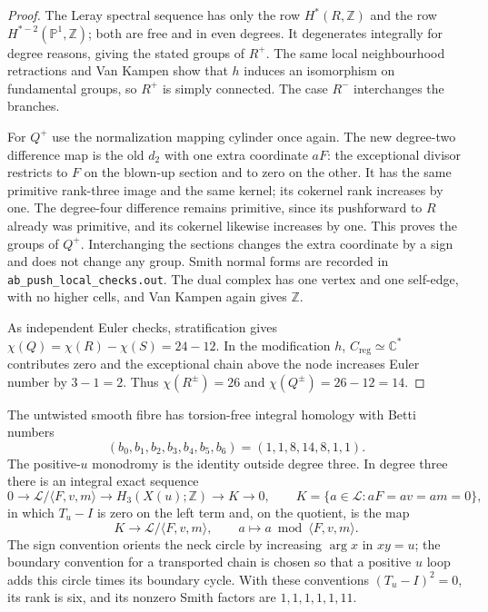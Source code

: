 \begin{proof}
The Leray spectral sequence has only the row $H^*(R,\mathbb Z)$
and the row $H^{*-2}(\mathbb P^1,\mathbb Z)$; both are free
and in even degrees. It degenerates integrally for degree
reasons, giving the stated groups of $R^+$. The same local
neighbourhood retractions and Van Kampen show that $h$ induces
an isomorphism on fundamental groups, so $R^+$ is simply
connected. The case $R^-$ interchanges the branches.

For $Q^+$ use the normalization mapping cylinder once again.
The new degree-two difference map is the old $d_2$ with
one extra coordinate $aF$: the exceptional divisor restricts
to $F$ on the blown-up section and to zero on the other.
It has the same primitive rank-three image and the same
kernel; its cokernel rank increases by one. The degree-four
difference remains primitive, since its pushforward to $R$
already was primitive, and its cokernel likewise increases
by one. This proves the groups of $Q^+$. Interchanging the
sections changes the extra coordinate by a sign and does
not change any group. Smith normal forms are recorded in
\texttt{ab\_push\_local\_checks.out}. The dual complex has
one vertex and one self-edge, with no higher cells, and
Van Kampen again gives $\mathbb Z$.

As independent Euler checks, stratification gives
$\chi(Q)=\chi(R)-\chi(S)=24-12$. In the modification $h$,
$C_{\mathrm{reg}}\simeq\mathbb C^*$ contributes zero and
the exceptional chain above the node increases Euler number
by $3-1=2$. Thus $\chi(R^\pm)=26$ and
$\chi(Q^\pm)=26-12=14$.
\end{proof}

\begin{proposition}\label{push:src:A.4.2}\label{push:A42}
The untwisted smooth fibre has torsion-free integral homology
with Betti numbers
\[
 (b_0,b_1,b_2,b_3,b_4,b_5,b_6)=(1,1,8,14,8,1,1).
\]
The positive-$u$ monodromy is the identity outside degree three.
In degree three there is an integral exact sequence
\[
 0\longrightarrow \mathcal L/\langle F,v,m\rangle
 \longrightarrow H_3(X(u);\mathbb Z)
 \longrightarrow K\longrightarrow0,\qquad
 K=\{a\in\mathcal L:aF=av=am=0\},
\]
in which $T_u-I$ is zero on the left term and, on the quotient,
is the map
\[
 K\longrightarrow \mathcal L/\langle F,v,m\rangle,\qquad
 a\longmapsto a\bmod\langle F,v,m\rangle.
\]
The sign convention orients the neck circle by increasing
$\arg x$ in $xy=u$; the boundary convention for a transported
chain is chosen so that a positive $u$ loop adds this circle
times its boundary cycle. With these conventions
$(T_u-I)^2=0$, its rank is six, and its nonzero Smith factors
are $1,1,1,1,1,11$.
\end{proposition}

